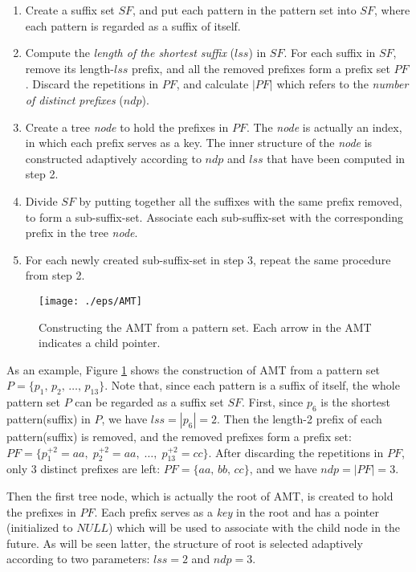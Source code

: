\documentclass{article}
\begin{document}
\begin{enumerate}
\item Create a suffix set $SF$, and put each pattern in the pattern
  set into $SF$, where each pattern is regarded as a suffix of itself.
\item Compute the \emph{length of the shortest suffix} ($lss$) in
  $SF$. For each suffix in $SF$, remove its length-$lss$ prefix, and
  all the removed prefixes form a prefix set $PF$. Discard the
  repetitions in $PF$, and calculate $|PF|$ which refers to the
  \emph{number of distinct prefixes} ($ndp$).
\item Create a tree \emph{node} to hold the prefixes in $PF$. The
  \emph{node} is actually an index, in which each prefix serves as a
  key. The inner structure of the \emph{node} is constructed
  adaptively according to $ndp$ and $lss$ that have been computed in
  step 2.
\item Divide $SF$ by putting together all the suffixes with the same
  prefix removed, to form a sub-suffix-set. Associate each
  sub-suffix-set with the corresponding prefix in the tree
  \emph{node}.
\item For each newly created sub-suffix-set in step 3, repeat the same
  procedure from step 2.
\end{enumerate}

\begin{figure}[htbp]
  \centering
  \texttt{[image: ./eps/AMT]}
  \caption{Constructing the AMT from a pattern set. Each arrow
    in the AMT indicates a child pointer.}
  \label{fig:AMT}
\end{figure}

As an example, Figure \ref{fig:AMT} shows the construction of AMT from
a pattern set $P = \{p_1,\, p_2,\, \dots,\, p_{13}\}$. Note that,
since each pattern is a suffix of itself, the whole pattern set $P$
can be regarded as a suffix set $SF$.  First, since $p_6$ is the
shortest pattern(suffix) in $P$, we have $lss = |p_6| = 2$. Then the
length-2 prefix of each pattern(suffix) is removed, and the removed
prefixes form a prefix set:
$PF = \{p_1^{+2} = aa,\; p_2^{+2} = aa,\; \dots,\; p_{13}^{+2} =
cc\}$.  After discarding the repetitions in $PF$, only 3 distinct
prefixes are left: $PF = \{aa,\, bb,\, cc\}$, and we have
$ndp = |PF| = 3$.

Then the first tree node, which is actually the root of AMT, is
created to hold the prefixes in $PF$. Each prefix serves as a
\emph{key} in the root and has a pointer (initialized to $NULL$) which
will be used to associate with the child node in the future. As will
be seen latter, the structure of root is selected adaptively according
to two parameters: $lss=2$ and $ndp=3$.
\end{document}
